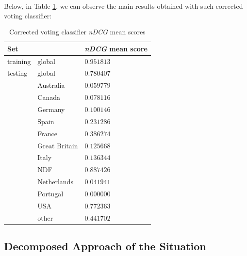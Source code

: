 \documentclass[twocolumn, switch]{article}
\begin{document}
Below, in Table \ref{tab:cvc}, we can observe the main results obtained with such corrected voting classifier:

\begin{table}[H]
\caption{Corrected voting classifier \textit{nDCG} mean scores}
\centering
\begin{tabular}{lll}
\toprule
Set & & \textit{nDCG} mean score \\
\midrule
training & global & $0.951813$ \\
testing & global & $0.780407$ \\
& Australia & $0.059779$ \\
& Canada & $0.078116$ \\
& Germany & $0.100146$ \\
& Spain & $0.231286$ \\
& France & $0.386274$ \\
& Great Britain & $0.125668$ \\
& Italy & $0.136344$ \\
& NDF & $0.887426$ \\
& Netherlands & $0.041941$ \\
& Portugal & $0.000000$ \\
& USA & $0.772363$ \\
& other & $0.441702$ \\
\bottomrule
\end{tabular}
\label{tab:cvc}
\end{table}

\subsection{Decomposed Approach of the Situation}
\end{document}
